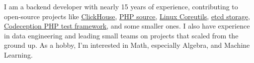 I am a backend developer with nearly 15 years of experience, contributing to
open-source projects like
\href{https://github.com/ClickHouse/ClickHouse/pulls?q=is\%3Apr+is\%3Aclosed+author\%3AGSokol}{\underline{ClickHouse}},
\href{https://github.com/php/php-src/pulls?q=is\%3Apr+is\%3Aclosed+author\%3AGSokol}{\underline{PHP source}},
\href{https://github.com/coreutils/coreutils/commits?author=GSokol}{\underline{Linux Coreutils}},
\href{https://github.com/etcd-io/etcd/pulls?q=is\%3Apr+is\%3Aclosed+author\%3AGSokol}{\underline{etcd storage}},
\href{https://github.com/Codeception/Codeception/pulls?q=is\%3Apr+is\%3Aclosed+author\%3AGSokol}{\underline{Codeception PHP test framework}},
and some smaller ones. I also have experience in data engineering and leading
small teams on projects that scaled from the ground up. As a hobby, I'm
interested in Math, especially Algebra, and Machine Learning.
